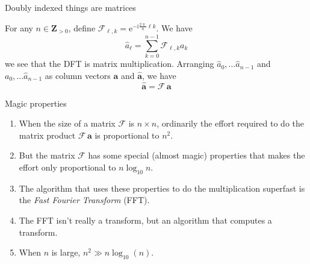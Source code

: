 \documentclass[portrait,fleqn,12pt]{beamer}
\newcommand{\integers}{\mathbf{Z}}
\newcommand{\euler}{\mathrm{e}}
\newcommand{\imag}{\mathrm{i}}
\newenvironment{handlist}
   {\begin{enumerate}[\faHandPointRight]
       \addtolength{\itemsep}{0.0\itemsep}}
     {\end{enumerate}}
\begin{document}
  \begin{frame}{Doubly indexed things are matrices}
 
 For any $n \in \integers_{>0}$, define $\mathcal{F}_{\ell, k}  = \euler^{-  \imag \frac{2 \uppi}{n}  \ell  k}$. We  have
   \begin{equation*}
      \widehat a_\ell = \sum_{k=0}^{n-1}  \mathcal{F}_{\ell, k} a_k
  \end{equation*}
  we see that the DFT is matrix multiplication. Arranging $\widehat a_0, \dots \widehat a_{n-1}$ and  
   $a_0, \dots \widehat a_{n-1}$ as column vectors $\mathbf{a}$ and  $\widehat{\mathbf{a}}$, we have
    \begin{equation*}
      \widehat{\mathbf{a}}  = \mathcal{F} \, \mathbf{a}
  \end{equation*}
  
    \end{frame}
    
     \begin{frame}{Magic properties}
     
     \begin{handlist}
     \item When the size of a matrix $\mathcal{F}$ is $n\times n$, ordinarily  the effort required to do the matrix product $ \mathcal{F} \, \mathbf{a}$ is proportional to $n^2$.  
     
     \item But the matrix $\mathcal{F}$ has some special (almost magic) properties that 
     makes the effort only proportional to 
     $n \log_{10} n$.
     
     \item The algorithm that uses these properties to do the multiplication superfast is the \emph{Fast Fourier Transform} (FFT).
     
     \item The FFT isn't really a transform, but an algorithm that computes a transform.
     
     \item When $n$ is large, $n^2 \gg n \log_{10}(n)$.
 
 \end{handlist}
  
    \end{frame}
    
    
\end{document}
